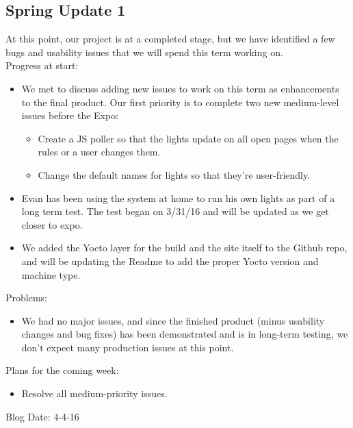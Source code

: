 \subsection{Spring Update 1}
At this point, our project is at a completed stage, but we have identified a few bugs and usability issues that we will spend this term working on.\\
Progress at start:
\begin{itemize}
   \item We met to discuss adding new issues to work on this term as enhancements to the final product. Our first priority is to complete two new medium-level issues before the Expo:
      \begin{itemize}
         \item Create a JS poller so that the lights update on all open pages when the rules or a user changes them.
         \item Change the default names for lights so that they're user-friendly.
      \end{itemize}
   \item Evan has been using the system at home to run his own lights as part of a long term test. The test began on 3/31/16 and will be updated as we get closer to expo.
   \item We added the Yocto layer for the build and the site itself to the Github repo, and will be updating the Readme to add the proper Yocto version and machine type.
\end{itemize}
Problems:
\begin{itemize}
   \item We had no major issues, and since the finished product (minus usability changes and bug fixes) has been demonstrated and is in long-term testing, we don't expect many production issues at this point.
\end{itemize}
Plans for the coming week:
\begin{itemize}
   \item Resolve all medium-priority issues.
\end{itemize}
Blog Date: 4-4-16

